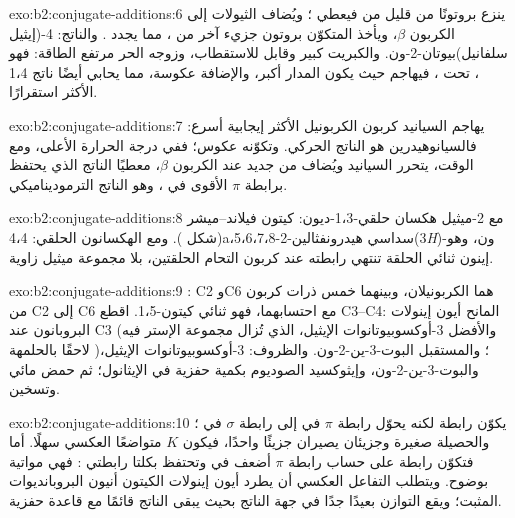\begin{solution}{exo:b2:conjugate-additions:6}
ينزع  بروتونًا من قليل من  فيعطي ؛ ويُضاف الثيولات إلى الكربون $\beta$، 
ويأخذ  المتكوّن بروتون جزيء آخر من ، مما يجدد . والناتج:
4-(إيثيل سلفانيل)بيوتان-2-ون. والكبريت كبير وقابل للاستقطاب، وزوجه الحر مرتفع الطاقة: فهو ، تحت ، فيهاجم حيث يكون المدار  أكبر، والإضافة
عكوسة، مما يحابي أيضًا ناتج 1،4 الأكثر استقرارًا.
\end{solution}

\begin{solution}{exo:b2:conjugate-additions:7}
يهاجم السيانيد كربون الكربونيل الأكثر إيجابية أسرع: فالسيانوهيدرين هو الناتج الحركي. وتكوّنه
عكوس؛ ففي درجة الحرارة الأعلى، ومع الوقت، يتحرر السيانيد ويُضاف من جديد عند الكربون
$\beta$، معطيًا الناتج الذي يحتفظ برابطة $\pi$ الأقوى في ، وهو الناتج الترموديناميكي.
\end{solution}

\begin{solution}{exo:b2:conjugate-additions:8}
مع 2-ميثيل هكسان حلقي-1،3-ديون: كيتون فيلاند--ميشر (شكل ).
ومع الهكسانون الحلقي: 4،4a،5،6،7،8-سداسي هيدرونفثالين-2(3\textit{H})-ون، وهو إينون ثنائي الحلقة تنتهي
رابطته  عند كربون التحام الحلقتين، بلا مجموعة ميثيل زاوية.
\end{solution}

\begin{solution}{exo:b2:conjugate-additions:9}
: C2 وC6 هما الكربونيلان، وبينهما خمس ذرات كربون من C2 إلى C6 مع احتسابهما،
فهو ثنائي كيتون-1،5. اقطع C3--C4: المانح أيون إينولات البروبانون عند C3 (والأفضل 3-أوكسوبيوتانوات الإيثيل، الذي
تُزال مجموعة الإستر فيه لاحقًا بالحلمهة )؛ والمستقبل البوت-3-ين-2-ون. والظروف:
3-أوكسوبيوتانوات الإيثيل، والبوت-3-ين-2-ون، وإيثوكسيد الصوديوم بكمية حفزية في الإيثانول؛ ثم حمض مائي 
وتسخين.
\end{solution}

\begin{solution}{exo:b2:conjugate-additions:10}
يكوّن  رابطة  لكنه يحوّل رابطة $\pi$ في  إلى رابطة $\sigma$ في ؛ 
والحصيلة صغيرة وجزيئان يصيران جزيئًا واحدًا، فيكون $K$ متواضعًا  العكسي سهلًا. أما
 فتكوّن رابطة  على حساب رابطة $\pi$ أضعف في  وتحتفظ بكلتا
رابطتي : فهي مواتية بوضوح. ويتطلب التفاعل العكسي أن يطرد أيون إينولات الكيتون أنيون البروبانديوات المثبت؛ 
ويقع التوازن بعيدًا جدًا في جهة الناتج بحيث يبقى الناتج قائمًا مع قاعدة حفزية.
\end{solution}

